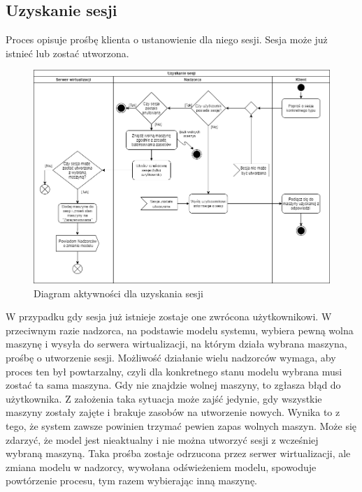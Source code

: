 \documentclass[../opis-rozwiazania.tex]{subfiles}
\begin{document}
\label{diagrams:activity_diagrams}

\subsection{Uzyskanie sesji}

Proces opisuje prośbę klienta o ustanowienie dla niego sesji. Sesja może już istnieć lub zostać utworzona.

\begin{figure}[H]
    \centering
    \includegraphics[width=\textwidth]{../diagrams/activity_diagrams/uzyskanie_sesji.png}
    \caption{Diagram aktywności dla uzyskania sesji}
    \label{start_session}
\end{figure}

W przypadku gdy sesja już istnieje zostaje one zwrócona użytkownikowi.
W przeciwnym razie nadzorca, na podstawie modelu systemu, wybiera pewną wolna maszynę i wysyła do serwera wirtualizacji, na którym działa wybrana maszyna, prośbę o utworzenie sesji. Możliwość działanie wielu nadzorców wymaga, aby proces ten był powtarzalny, czyli dla konkretnego stanu modelu wybrana musi zostać ta sama maszyna.
Gdy nie znajdzie wolnej maszyny, to zgłasza błąd do użytkownika.
Z założenia taka sytuacja może zajść jedynie, gdy wszystkie maszyny zostały zajęte i brakuje zasobów na utworzenie nowych. Wynika to z tego, że system zawsze powinien trzymać pewien zapas wolnych maszyn.
Może się zdarzyć, że model jest nieaktualny i nie można utworzyć sesji z wcześniej wybraną maszyną.
Taka prośba zostaje odrzucona przez serwer wirtualizacji, ale zmiana modelu w nadzorcy, wywołana odświeżeniem modelu, spowoduje powtórzenie procesu, tym razem wybierając inną maszynę.
\end{document}

